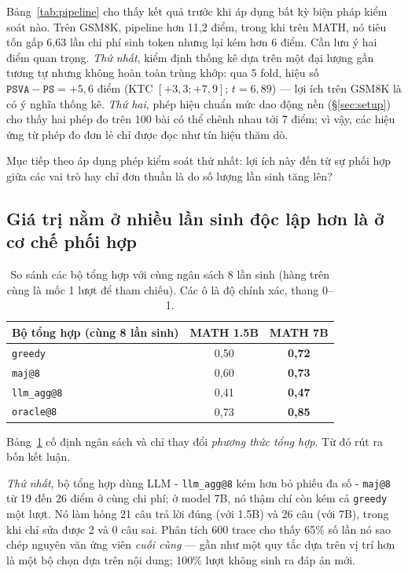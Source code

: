 \documentclass[11pt,a4paper]{article}
\begin{document}
Bảng~\ref{tab:pipeline} cho thấy kết quả trước khi áp dụng bất kỳ biện pháp kiểm soát nào. Trên GSM8K, pipeline hơn 11,2 điểm, trong khi trên MATH, nó tiêu tốn gấp 6,63 lần chi phí sinh token nhưng lại kém hơn 6 điểm. Cần lưu ý hai điểm quan trọng. \emph{Thứ nhất}, kiểm định thống kê dựa trên một đại lượng gần tương tự nhưng không hoàn toàn trùng khớp: qua 5 fold, hiệu số $\texttt{PSVA}-\texttt{PS} = +5{,}6$ điểm (KTC $[+3{,}3;+7{,}9]$; $t=6{,}89$) --- lợi ích trên GSM8K là có ý nghĩa thống kê. \emph{Thứ hai}, phép hiệu chuẩn mức dao động nền (\S\ref{sec:setup}) cho thấy hai phép đo trên 100 bài có thể chênh nhau tới 7 điểm; vì vậy, các hiệu ứng từ phép đo đơn lẻ chỉ được đọc như tín hiệu thăm dò.

Mục tiếp theo áp dụng phép kiểm soát thứ nhất: lợi ích này đến từ sự phối hợp giữa các vai trò hay chỉ đơn thuần là do số lượng lần sinh tăng lên?

\subsection{Giá trị nằm ở nhiều lần sinh độc lập hơn là ở cơ chế phối hợp}\label{sec:budget}

\begin{table}[h]\centering\small
\begin{tabular}{@{}l c c@{}}
\toprule
Bộ tổng hợp (cùng 8 lần sinh) & MATH 1.5B & MATH 7B\\
\midrule
\texttt{greedy} & 0,50 & \textbf{0,72}\\
\texttt{maj@8}     & 0,60 & \textbf{0,73}\\
\texttt{llm\_agg@8} & 0,41 & \textbf{0,47}\\
\texttt{oracle@8}      & 0,73 & \textbf{0,85}\\
\bottomrule
\end{tabular}
\caption{So sánh các bộ tổng hợp với cùng ngân sách 8 lần sinh (hàng trên cùng là mốc 1 lượt để tham chiếu). Các ô là độ chính xác, thang 0--1.}
\label{tab:budget}
\end{table}

Bảng~\ref{tab:budget} cố định ngân sách và chỉ thay đổi \emph{phương thức tổng hợp}. Từ đó rút ra bốn kết luận.

\emph{Thứ nhất}, bộ tổng hợp dùng LLM - \texttt{llm\_agg@8} kém hơn bỏ phiếu đa số - \texttt{maj@8} từ 19 đến 26 điểm ở cùng chi phí; ở model 7B, nó thậm chí còn kém cả \texttt{greedy} một lượt. Nó làm hỏng 21 câu trả lời đúng (với 1.5B) và 26 câu (với 7B), trong khi chỉ sửa được 2 và 0 câu sai. Phân tích 600 trace cho thấy 65\% số lần nó sao chép nguyên văn ứng viên \emph{cuối cùng} --- gần như một quy tắc dựa trên vị trí hơn là một bộ chọn dựa trên nội dung; 100\% lượt không sinh ra đáp án mới.
\end{document}
